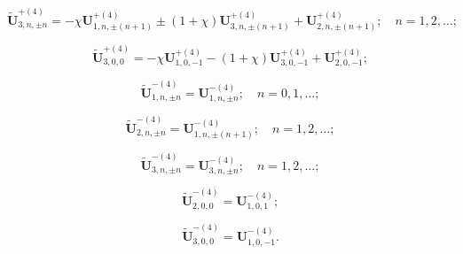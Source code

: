 \begin{equation}\label{eq:1:93b}
\mathbf{\tilde U}_{3,n,\pm n}^{+(4)}=-\chi\mathbf{U}_{1,n,\pm (n+1)}^{+(4)}\pm(1+\chi)\mathbf{U}_{3,n,\pm (n+1)}^{+(4)}+\mathbf{U}_{2,n,\pm (n+1)}^{+(4)};\quad n=1,2,\dots;
\end{equation}

\begin{equation}\label{eq:1:94b}
\mathbf{\tilde U}_{3,0,0}^{+(4)}=-\chi\mathbf{U}_{1,0,-1}^{+(4)}-(1+\chi)\mathbf{U}_{3,0,-1}^{+(4)}+\mathbf{U}_{2,0,-1}^{+(4)};
\end{equation}

\begin{equation}\label{eq:1:95b}
\mathbf{\tilde U}_{1,n,\pm n}^{-(4)}=\mathbf{U}_{1,n,\pm n}^{-(4)};\quad n=0,1,\dots;
\end{equation}

\begin{equation}\label{eq:1:96b}
\mathbf{\tilde U}_{2,n,\pm n}^{-(4)}=\mathbf{U}_{1,n,\pm (n+1)}^{-(4)};\quad n=1,2,\dots;
\end{equation}

\begin{equation}\label{eq:1:97b}
\mathbf{\tilde U}_{3,n,\pm n}^{-(4)}=\mathbf{U}_{3,n,\pm n}^{-(4)};\quad n=1,2,\dots;
\end{equation}

\begin{equation}\label{eq:1:98b}
\mathbf{\tilde U}_{2,0,0}^{-(4)}=\mathbf{U}_{1,0,1}^{-(4)};
\end{equation}

\begin{equation}\label{eq:1:99b}
\mathbf{\tilde U}_{3,0,0}^{-(4)}=\mathbf{U}_{1,0,-1}^{-(4)}.
\end{equation}

